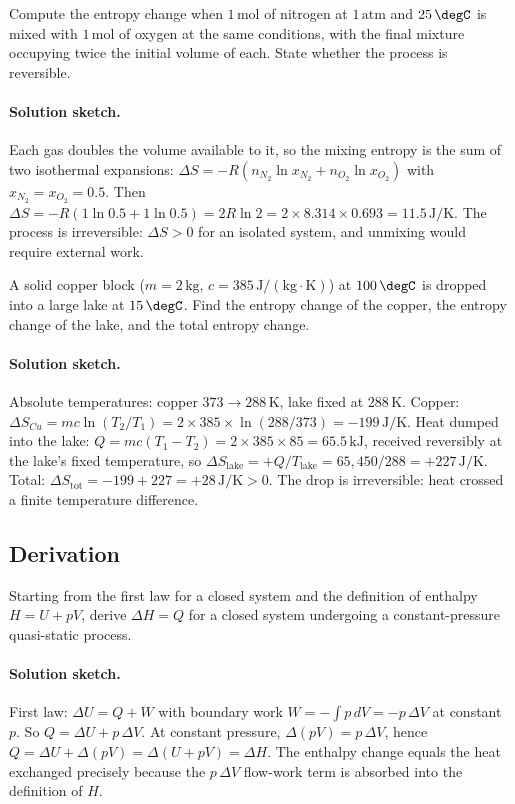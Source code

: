 \begin{exercise}
Compute the entropy change when $1\,\text{mol}$ of nitrogen at
$1\,\text{atm}$ and $25\,\degC$ is mixed with $1\,\text{mol}$ of oxygen
at the same conditions, with the final mixture occupying twice the
initial volume of each. State whether the process is reversible.
\paragraph{Solution sketch.} Each gas doubles the volume available to
it, so the mixing entropy is the sum of two isothermal expansions:
$\Delta S = -R(n_{N_2}\ln x_{N_2} + n_{O_2}\ln x_{O_2})$ with
$x_{N_2} = x_{O_2} = 0.5$. Then $\Delta S = -R(1\ln 0.5 + 1\ln 0.5) =
2R\ln 2 = 2 \times 8.314 \times 0.693 = 11.5\,\text{J}/\si{\kelvin}$.
The process is irreversible: $\Delta S > 0$ for an isolated system, and
unmixing would require external work.
\end{exercise}

\begin{exercise}
A solid copper block ($m = 2\,\text{kg}$, $c = 385\,\text{J}/(\text{kg}
\cdot\si{\kelvin})$) at $100\,\degC$ is dropped into a large lake at
$15\,\degC$. Find the entropy change of the copper, the entropy
change of the lake, and the total entropy change.
\paragraph{Solution sketch.} Absolute temperatures: copper $373\to
288\,\si{\kelvin}$, lake fixed at $288\,\si{\kelvin}$. Copper:
$\Delta S_{Cu} = m c \ln(T_2/T_1) = 2 \times 385 \times \ln(288/373) =
-199\,\text{J}/\si{\kelvin}$. Heat dumped into the lake:
$Q = m c (T_1 - T_2) = 2 \times 385 \times 85 = 65.5\,\text{kJ}$,
received reversibly at the lake's fixed temperature, so
$\Delta S_{\text{lake}} = +Q/T_{\text{lake}} = 65{,}450/288 =
+227\,\text{J}/\si{\kelvin}$. Total:
$\Delta S_{\text{tot}} = -199 + 227 = +28\,\text{J}/\si{\kelvin} > 0$.
The drop is irreversible: heat crossed a finite temperature difference.
\end{exercise}

\subsection*{Derivation}

\begin{exercise}
Starting from the first law for a closed system and the definition of
enthalpy $H = U + pV$, derive $\Delta H = Q$ for a closed system
undergoing a constant-pressure quasi-static process.
\paragraph{Solution sketch.} First law: $\Delta U = Q + W$ with boundary
work $W = -\int p\,dV = -p\,\Delta V$ at constant $p$. So $Q = \Delta U
+ p\,\Delta V$. At constant pressure, $\Delta(pV) = p\,\Delta V$, hence
$Q = \Delta U + \Delta(pV) = \Delta(U + pV) = \Delta H$. The enthalpy
change equals the heat exchanged precisely because the $p\,\Delta V$
flow-work term is absorbed into the definition of $H$.
\end{exercise}

